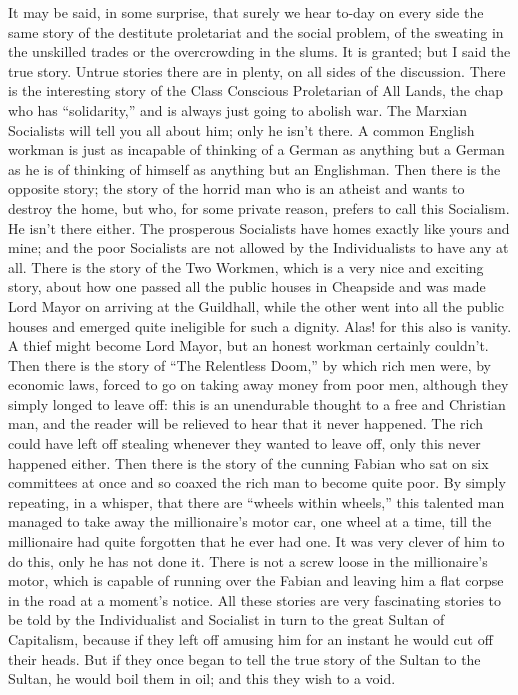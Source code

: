\documentclass{book}
\begin{document}
It may be said, in some surprise, that surely we hear to-day on every side the same story of the destitute proletariat and the social problem, of the sweating in the unskilled trades or the overcrowding in the slums. It is granted; but I said the true story. Untrue stories there are in plenty, on all sides of the discussion. There is the interesting story of the Class Conscious Proletarian of All Lands, the chap who has “solidarity,” and is always just going to abolish war. The Marxian Socialists will tell you all about him; only he isn’t there. A common English workman is just as incapable of thinking of a German as anything but a German as he is of thinking of himself as anything but an Englishman. Then there is the opposite story; the story of the horrid man who is an atheist and wants to destroy the home, but who, for some private reason, prefers to call this Socialism. He isn’t there either. The prosperous Socialists have homes exactly like yours and mine; and the poor Socialists are not allowed by the Individualists to have any at all. There is the story of the Two Workmen, which is a very nice and exciting story, about how one passed all the public houses in Cheapside and was made Lord Mayor on arriving at the Guildhall, while the other went into all the public houses and emerged quite ineligible for such a dignity. Alas! for this also is vanity. A thief might become Lord Mayor, but an honest workman certainly couldn’t. Then there is the story of “The Relentless Doom,” by which rich men were, by economic laws, forced to go on taking away money from poor men, although they simply longed to leave off: this is an unendurable thought to a free and Christian man, and the reader will be relieved to hear that it never happened. The rich could have left off stealing whenever they wanted to leave off, only this never happened either. Then there is the story of the cunning Fabian who sat on six committees at once and so coaxed the rich man to become quite poor. By simply repeating, in a whisper, that there are “wheels within wheels,” this talented man managed to take away the millionaire’s motor car, one wheel at a time, till the millionaire had quite forgotten that he ever had one. It was very clever of him to do this, only he has not done it. There is not a screw loose in the millionaire’s motor, which is capable of running over the Fabian and leaving him a flat corpse in the road at a moment’s notice. All these stories are very fascinating stories to be told by the Individualist and Socialist in turn to the great Sultan of Capitalism, because if they left off amusing him for an instant he would cut off their heads. But if they once began to tell the true story of the Sultan to the Sultan, he would boil them in oil; and this they wish to a void.
\end{document}
